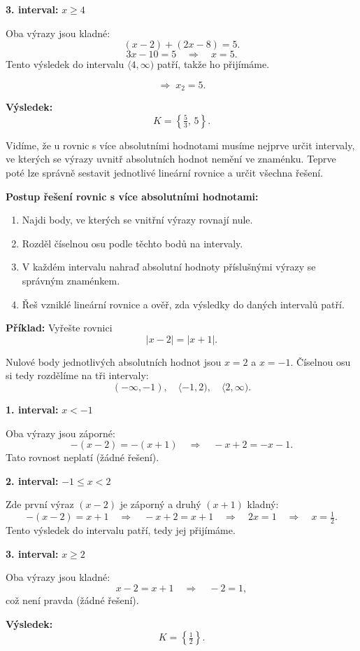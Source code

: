 \documentclass[12pt,a4paper]{article}
\begin{document}
\medskip
\textbf{3. interval:} \(x \ge 4\)

Oba výrazy jsou kladné:
\[
(x - 2) + (2x - 8) = 5.
\]
\[
3x - 10 = 5 \quad \Rightarrow \quad x = 5.
\]
Tento výsledek do intervalu \(\langle 4, \infty)\) patří, takže ho přijímáme.

\[
\Rightarrow \; x_2 = 5.
\]

\medskip
\textbf{Výsledek:}
\[
K = \left\{\tfrac{5}{3},\,5\right\}.
\]


\noindent
Vidíme, že u rovnic s více absolutními hodnotami musíme nejprve určit intervaly,  
ve kterých se výrazy uvnitř absolutních hodnot nemění ve znaménku.  
Teprve poté lze správně sestavit jednotlivé lineární rovnice a určit všechna řešení.

\begin{notebox}
\textbf{Postup řešení rovnic s více absolutními hodnotami:}
\begin{enumerate}[label=\arabic*.]
  \item Najdi body, ve kterých se vnitřní výrazy rovnají nule.
  \item Rozděl číselnou osu podle těchto bodů na intervaly.
  \item V každém intervalu nahraď absolutní hodnoty příslušnými výrazy se správným znaménkem.
  \item Řeš vzniklé lineární rovnice a ověř, zda výsledky do daných intervalů patří.
\end{enumerate}
\end{notebox}

\begin{examplebox}
\textbf{Příklad:}  
Vyřešte rovnici
\[
|x - 2| = |x + 1|.
\]

Nulové body jednotlivých absolutních hodnot jsou \(x = 2\) a \(x = -1\).  
Číselnou osu si tedy rozdělíme na tři intervaly:
\[
(-\infty, -1), \quad \langle -1, 2), \quad \langle 2, \infty).
\]

\newpage
\textbf{1. interval:} \(x < -1\)

Oba výrazy jsou záporné:
\[
-(x - 2) = -(x + 1) \quad \Rightarrow \quad -x + 2 = -x - 1.
\]
Tato rovnost neplatí (žádné řešení).

\medskip
\textbf{2. interval:} \(-1 \le x < 2\)

Zde první výraz \((x - 2)\) je záporný a druhý \((x + 1)\) kladný:
\[
-(x - 2) = x + 1 \quad \Rightarrow \quad -x + 2 = x + 1 \quad \Rightarrow \quad 2x = 1 \quad \Rightarrow \quad x = \tfrac{1}{2}.
\]
Tento výsledek do intervalu patří, tedy jej přijímáme.

\medskip
\textbf{3. interval:} \(x \ge 2\)

Oba výrazy jsou kladné:
\[
x - 2 = x + 1 \quad \Rightarrow \quad -2 = 1,
\]
což není pravda (žádné řešení).

\medskip
\textbf{Výsledek:}
\[
K = \left\{\tfrac{1}{2}\right\}.
\]
\end{examplebox}
\end{document}
